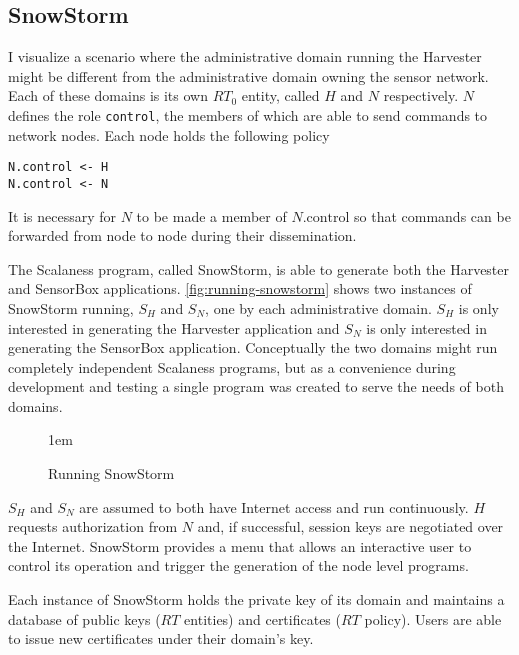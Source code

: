 \subsection{SnowStorm}


I visualize a scenario where the administrative domain running the Harvester might be different
from the administrative domain owning the sensor network. Each of these domains is its own
$RT_0$ entity, called $H$ and $N$ respectively. $N$ defines the role \texttt{control}, the
members of which are able to send commands to network nodes. Each node holds the following
policy
\begin{Verbatim}
N.control <- H
N.control <- N
\end{Verbatim}

It is necessary for $N$ to be made a member of $N.\textrm{control}$ so that commands can be
forwarded from node to node during their dissemination. 

The Scalaness program, called SnowStorm, is able to generate both the Harvester and SensorBox
applications. \autoref{fig:running-snowstorm} shows two instances of SnowStorm running, $S_H$
and $S_N$, one by each administrative domain. $S_H$ is only interested in generating the
Harvester application and $S_N$ is only interested in generating the SensorBox application.
Conceptually the two domains might run completely independent Scalaness programs, but as a
convenience during development and testing a single program was created to serve the needs of
both domains.

\begin{figure}[htbp]
  
  \centerline{\raise 1em\box\graph}
  \caption{Running SnowStorm}
  \label{fig:running-snowstorm}
\end{figure}

$S_H$ and $S_N$ are assumed to both have Internet access and run continuously. $H$ requests
authorization from $N$ and, if successful, session keys are negotiated over the Internet.
SnowStorm provides a menu that allows an interactive user to control its operation and trigger
the generation of the node level programs.

Each instance of SnowStorm holds the private key of its domain and maintains a database of
public keys ($RT$ entities) and certificates ($RT$ policy). Users are able to issue new
certificates under their domain's key.


